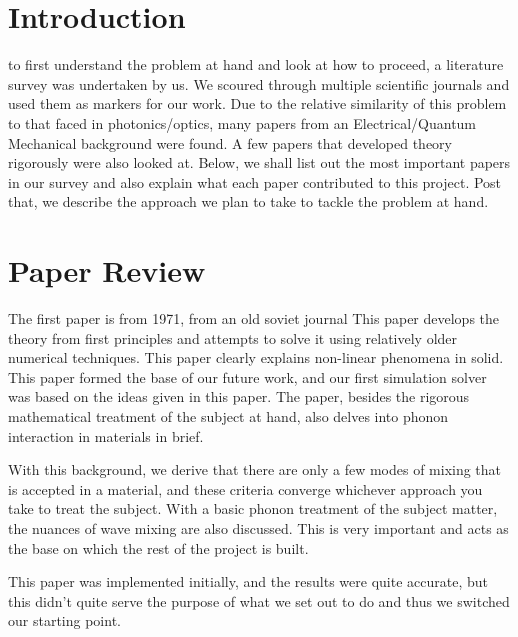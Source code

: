 \section{Introduction}
to first understand the problem at hand and look at how to proceed, a literature survey was undertaken by us. We scoured through multiple scientific journals and used them as markers for our work. Due to the relative similarity of this problem to that faced in photonics/optics, many papers from an Electrical/Quantum Mechanical background were found. A few papers that developed theory rigorously were also looked at. Below, we shall list out the most important papers in our survey and also explain what each paper contributed to this project. Post that, we describe the approach we plan to take to tackle the problem at hand.


\section{Paper Review}

The first paper is from 1971, from an old soviet journal \cite{zarem} This paper develops the theory from first principles and attempts to solve it using relatively older numerical techniques. This paper clearly explains non-linear phenomena in solid. This paper formed the base of our future work, and our first simulation solver was based on the ideas given in this paper. The paper, besides the rigorous mathematical treatment of the subject at hand, also delves into phonon interaction in materials in brief.

With this background, we derive that there are only a few modes of mixing that is accepted in a material, and these criteria converge whichever approach you take to treat the subject. With a basic phonon treatment of the subject matter, the nuances of wave mixing are also discussed. This is very important and acts as the base on which the rest of the project is built.

This paper was implemented initially, and the results were quite accurate, but this didn't quite serve the purpose of what we set out to do and thus we switched our starting point.


